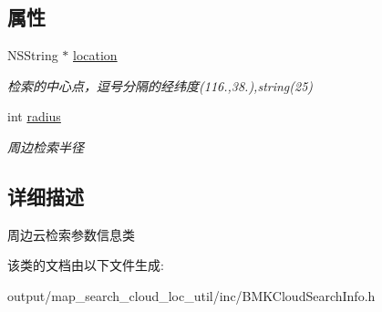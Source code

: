 \subsection*{属性}
\begin{DoxyCompactItemize}
\item 
\hypertarget{interface_b_m_k_cloud_nearby_search_info_ae129357a1f589b69f9a2f8ca3613f015}{N\+S\+String $\ast$ \hyperlink{interface_b_m_k_cloud_nearby_search_info_ae129357a1f589b69f9a2f8ca3613f015}{location}}\label{interface_b_m_k_cloud_nearby_search_info_ae129357a1f589b69f9a2f8ca3613f015}

\begin{DoxyCompactList}\small\item\em 检索的中心点，逗号分隔的经纬度(116.,38.),string(25) \end{DoxyCompactList}\item 
\hypertarget{interface_b_m_k_cloud_nearby_search_info_af736625a3a921ec13dd0c8a6deb1c52f}{int \hyperlink{interface_b_m_k_cloud_nearby_search_info_af736625a3a921ec13dd0c8a6deb1c52f}{radius}}\label{interface_b_m_k_cloud_nearby_search_info_af736625a3a921ec13dd0c8a6deb1c52f}

\begin{DoxyCompactList}\small\item\em 周边检索半径 \end{DoxyCompactList}\end{DoxyCompactItemize}


\subsection{详细描述}
周边云检索参数信息类 

该类的文档由以下文件生成\+:\begin{DoxyCompactItemize}
\item 
output/map\+\_\+search\+\_\+cloud\+\_\+loc\+\_\+util/inc/B\+M\+K\+Cloud\+Search\+Info.\+h\end{DoxyCompactItemize}
